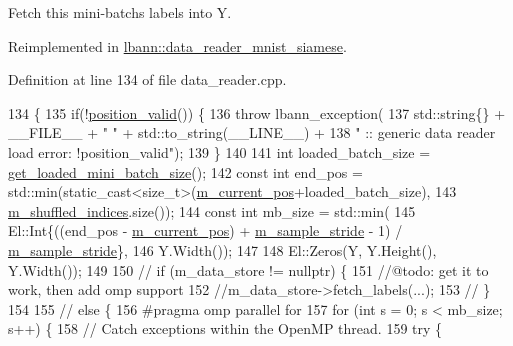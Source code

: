 Fetch this mini-\/batch\textquotesingle{}s labels into Y. 



Reimplemented in \hyperlink{classlbann_1_1data__reader__mnist__siamese_a1709140fcdcea9baaaf1bab7a48f3bce}{lbann\+::data\+\_\+reader\+\_\+mnist\+\_\+siamese}.



Definition at line 134 of file data\+\_\+reader.\+cpp.


\begin{DoxyCode}
134                                                  \{
135   \textcolor{keywordflow}{if}(!\hyperlink{classlbann_1_1generic__data__reader_a2b10538440d784f0f12582a5407acef2}{position\_valid}()) \{
136     \textcolor{keywordflow}{throw} lbann\_exception(
137       std::string\{\} + \_\_FILE\_\_ + \textcolor{stringliteral}{" "} + std::to\_string(\_\_LINE\_\_) +
138       \textcolor{stringliteral}{" :: generic data reader load error: !position\_valid"});
139   \}
140 
141   \textcolor{keywordtype}{int} loaded\_batch\_size = \hyperlink{classlbann_1_1generic__data__reader_a850e99110dd1e9df2985f09ea196fea8}{get\_loaded\_mini\_batch\_size}();
142   \textcolor{keyword}{const} \textcolor{keywordtype}{int} end\_pos = std::min(static\_cast<size\_t>(\hyperlink{classlbann_1_1generic__data__reader_a2facf4e410099ac8c1fa586e797ec2e0}{m\_current\_pos}+loaded\_batch\_size),
143                                \hyperlink{classlbann_1_1generic__data__reader_aaab6aeff67ffff1c689336851fec2c57}{m\_shuffled\_indices}.size());
144   \textcolor{keyword}{const} \textcolor{keywordtype}{int} mb\_size = std::min(
145     El::Int\{((end\_pos - \hyperlink{classlbann_1_1generic__data__reader_a2facf4e410099ac8c1fa586e797ec2e0}{m\_current\_pos}) + \hyperlink{classlbann_1_1generic__data__reader_a58461c39de7e17eafc5b98aec99cbb9b}{m\_sample\_stride} - 1) / 
      \hyperlink{classlbann_1_1generic__data__reader_a58461c39de7e17eafc5b98aec99cbb9b}{m\_sample\_stride}\},
146     Y.Width());
147 
148   El::Zeros(Y, Y.Height(), Y.Width());
149 
150 \textcolor{comment}{//  if (m\_data\_store != nullptr) \{}
151     \textcolor{comment}{//@todo: get it to work, then add omp support}
152     \textcolor{comment}{//m\_data\_store->fetch\_labels(...);}
153  \textcolor{comment}{// \}}
154 
155 \textcolor{comment}{//  else \{}
156 \textcolor{preprocessor}{    #pragma omp parallel for}
157     \textcolor{keywordflow}{for} (\textcolor{keywordtype}{int} s = 0; s < mb\_size; s++) \{
158       \textcolor{comment}{// Catch exceptions within the OpenMP thread.}
159       \textcolor{keywordflow}{try} \{

\end{DoxyCode}
